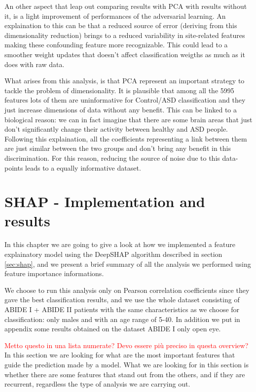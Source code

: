\documentclass[10pt]{report}
\begin{document}
An other aspect that leap out comparing results with PCA with results without it, is a light improvement of performances of the adversarial learning.
An explaination to this can be that a reduced source of error (deriving from this dimensionality reduction) brings to a reduced variability in site-related features making these confounding feature more recognizable. This could lead to a smoother weight updates that doesn't affect classification weigths as much as it does with raw data.

What arises from this analysis, is that PCA represent an important strategy to tackle the problem of dimensionality. It is plausible tbat among all the 5995 features lots of them are uninformative for Control/ASD classification and they just increase dimensions of data without any benefit. This can be linked to a biological reason: we can in fact imagine that there are some brain areas that just don't significantly change their activity between healthy and ASD people. Following this explaination, all the coefficients representing a link between them are just similar between the two groups and don't bring any benefit in this discrimination. For this reason, reducing the source of noise due to this data-points leads to a equally informative dataset.

\newpage


\chapter{SHAP - Implementation and results}

In this chapter we are going to give a look at how we implemented a feature explainatory model using the DeepSHAP algorithm described in section \ref{sec:shap}, and we present a brief summary of all the analysis we performed using feature importance informations.

We choose to run this analysis only on Pearson correlation coefficients since they gave the best classification results, and we use the whole dataset consisting of ABIDE I + ABIDE II patients with the same characteristics as we choose for classification: only males and with an age range of 5-40.
In addition we put in appendix some results obtained on the dataset ABIDE I only open eye.

\textcolor{red}{Metto questo in una lista numerate? Devo essere più preciso in questa overview?}
In this section we are looking for what are the most important features that guide the prediction made by a model.
What we are looking for in this section is whether there are some features that stand out from the others, and if they are recurrent, regardless the type of analysis we are carrying out.
\end{document}
